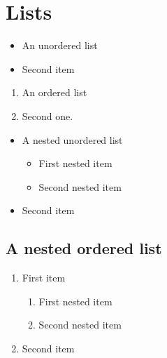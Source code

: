 \documentclass{article}
\begin{document}
  \section{Lists}

  \begin{itemize}
    \item An unordered list
    \item Second item
  \end{itemize}

  \begin{enumerate}
    \item An ordered list
    \item Second one.
  \end{enumerate}

  \begin{itemize}
    \item A nested unordered list
    \begin{itemize}
      \item First nested item
      \item Second nested item
    \end{itemize}
    \item Second item
  \end{itemize}

  \subsection{A nested ordered list}
  \begin{enumerate}
    \item First item
    \begin{enumerate}
      \item First nested item
      \item Second nested item
    \end{enumerate}
    \item Second item
  \end{enumerate}
\end{document}
